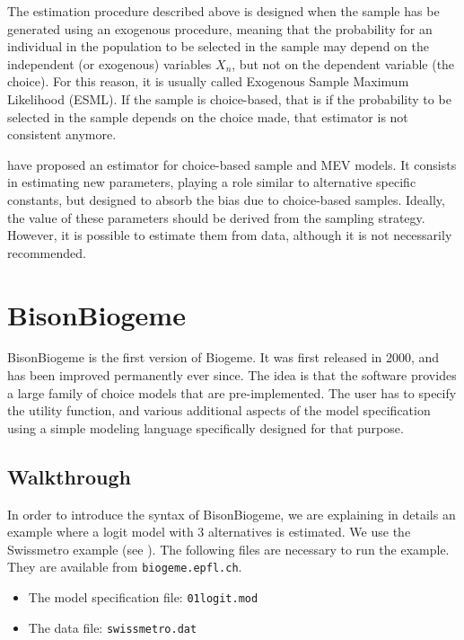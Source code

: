 \documentclass[12pt]{memoir}
\begin{document}
The estimation procedure described above is designed when the sample
has be generated using an exogenous procedure, meaning that the
probability for an individual in the population to be selected in the
sample may depend on the independent (or exogenous) variables $X_n$,
but not on the dependent variable (the choice). For this reason, it is
usually called Exogenous Sample Maximum Likelihood (ESML). If the
sample is choice-based, that is if the probability to be selected in
the sample depends on the choice made, that estimator is not
consistent anymore. 

 have proposed an estimator for
choice-based sample and MEV models. 
It consists in estimating new parameters,
playing a role similar to alternative specific constants, but designed
to absorb the  bias due to choice-based samples.  Ideally, the value
of these parameters should be derived from the sampling
strategy. However, it is possible to estimate them from data, although
it is not necessarily recommended. 






\chapter{BisonBiogeme}

BisonBiogeme is the first version of Biogeme. It was first released in
2000, and has been improved permanently ever since. The idea is that
the software provides a large family of choice models that are
pre-implemented. The user has to specify the utility function, and
various additional aspects of the model specification using a simple
modeling language specifically designed for that purpose.

\section{Walkthrough}


In order to introduce the syntax of  BisonBiogeme, we are explaining
in details an example where a logit model with 3 alternatives is
estimated. We use the Swissmetro example (see
\cite{BierAxhaAbay01}). The following files are necessary to run the
example. They are available from \texttt{biogeme.epfl.ch}.
\begin{itemize}
\item The model specification file: \texttt{01logit.mod}
\item The data file: \texttt{swissmetro.dat}
\end{itemize}
\end{document}
